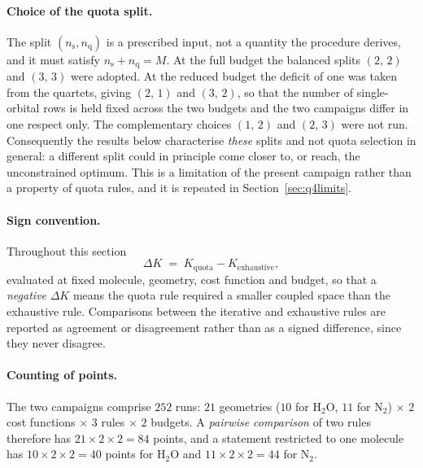 \paragraph{Choice of the quota split.}
The split $(n_{\mathrm{s}},n_{\mathrm{q}})$ is a prescribed input, not a
quantity the procedure derives, and it must satisfy
$n_{\mathrm{s}}+n_{\mathrm{q}}=M$. At the full budget the balanced splits
$(2,\,2)$ and $(3,\,3)$ were adopted. At the reduced budget the deficit of one was
taken from the quartets, giving $(2,\,1)$ and $(3,\,2)$, so that the number of
single-orbital rows is held fixed across the two budgets and the two campaigns
differ in one respect only. The complementary choices $(1,\,2)$ and $(2,\,3)$ were
not run. Consequently the results below characterise \emph{these} splits and
not quota selection in general: a different split could in principle come
closer to, or reach, the unconstrained optimum. This is a limitation of the
present campaign rather than a property of quota rules, and it is repeated in
Section~\ref{sec:q4limits}.

\paragraph{Sign convention.}
\begin{sloppypar}
Throughout this section
\begin{equation}
\Delta K \;=\; K_{\mathrm{quota}}-K_{\mathrm{exhaustive}},
\label{eq:dK}
\end{equation}
\noindent evaluated at fixed molecule, geometry, cost function and budget, so
that a \emph{negative} $\Delta K$ means the quota rule required a smaller coupled
space than the exhaustive rule. Comparisons between the iterative and
exhaustive rules are reported as agreement or disagreement rather than as a
signed difference, since they never disagree.
\end{sloppypar}

\paragraph{Counting of points.}
The two campaigns comprise $252$ runs: $21$ geometries ($10$ for
$\mathrm{H_2O}$, $11$ for $\mathrm{N_2}$) $\times$ $2$ cost functions $\times$
$3$ rules $\times$ $2$ budgets. A \emph{pairwise comparison} of two rules
therefore has $21\times2\times2=84$ points, and a statement restricted to one
molecule has $10\times2\times2=40$ points for $\mathrm{H_2O}$ and
$11\times2\times2=44$ for $\mathrm{N_2}$.

